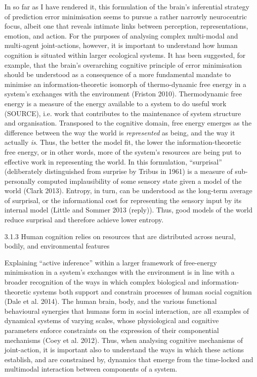           In so far as I have rendered it, this formulation of the brain’s inferential strategy of prediction error minimisation seems to pursue a rather narrowly neurocentric focus, albeit one that reveals intimate links between perception, representations, emotion, and action.  For the purposes of analysing complex multi-modal and multi-agent joint-actions, however, it is important to understand how human cognition is situated within larger ecological systems.  It has been suggested, for example, that the brain's overarching cognitive principle of error minimisation should be understood as a consequence of a more fundamental mandate to minimise an information-theoretic isomorph of thermo-dynamic free energy in a system’s exchanges with the environment (Friston 2010).  Thermodynamic free energy is a measure of the energy available to a system to do useful work (SOURCE), i.e. work that contributes to the maintenance of system structure and organisation.  Transposed to the cognitive domain, free energy emerges as the difference between the way the world is \textit{represented} as being, and the way it actually \textit{is}. Thus, the better the model fit, the lower the information-theoretic free energy, or in other words, more of the system’s resources are being put to effective work in representing the world.  In this formulation, ``surprisal'' (deliberately distinguished from surprise by Tribus in 1961) is a measure of sub-personally computed implausibility of some sensory state given a model of the world (Clark 2013).  Entropy, in turn, can be understood as the long-term average of surprisal, or the informational cost for representing the sensory input by its internal model (Little and Sommer 2013 (reply)).  Thus, good models of the world reduce surprisal and therefore achieve lower entropy.



      3.1.3 Human cognition relies on resources that are distributed across neural, bodily, and environmental features

          Explaining ``active inference'' within a larger framework of free-energy minimisation in a system’s exchanges with the environment is in line with a broader recognition of the ways in which complex biological and information-theoretic systems both support and constrain processes of human social cognition (Dale et al. 2014).  The human brain, body, and the various functional behavioural synergies that humans form in social interaction, are all examples of dynamical systems of varying scales, whose physiological and cognitive parameters enforce constraints on the expression of their componential mechanisms (Coey et al. 2012).  Thus, when analysing cognitive mechanisms of joint-action, it is important also to understand the ways in which these actions establish, and are constrained by, dynamics that emerge from the time-locked and multimodal interaction between components of a system.

